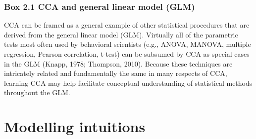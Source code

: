 \linespacesmall
\begin{shaded}
\footnotesize
\subsubsection*{Box 2.1 CCA and general linear model (GLM)}
\label{box:1}
\begin{minipage}[t]{1\textwidth}
\begin{multicols}{2}
CCA can be framed as a general example of other statistical procedures that are derived from the general linear model (GLM). Virtually all of the parametric tests most often used by behavioral scientists (e.g., ANOVA, MANOVA, multiple regression, Pearson correlation, t-test) can be subsumed by CCA as special cases in the GLM (Knapp, 1978; Thompson, 2010). Because these techniques are intricately related and fundamentally the same in many respects of CCA, learning CCA may help facilitate conceptual understanding of statistical methods throughout the GLM.
\end{multicols}
\end{minipage}
\end{shaded}
\linespacenormal

\section{Modelling intuitions}
\label{cca:intuitions}

